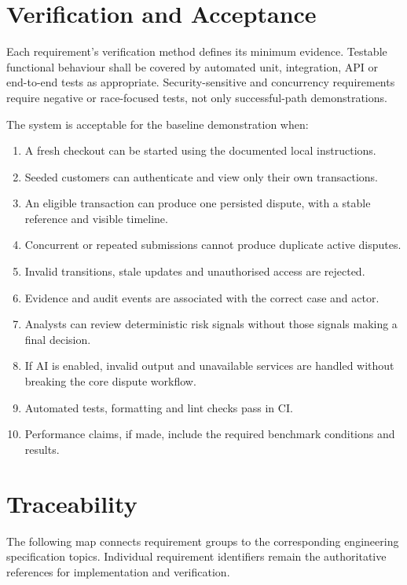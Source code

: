 \documentclass[11pt,a4paper]{article}
\begin{document}
\section{Verification and Acceptance}

Each requirement's verification method defines its minimum evidence.
Testable functional behaviour shall be covered by automated unit,
integration, API or end-to-end tests as appropriate. Security-sensitive
and concurrency requirements require negative or race-focused tests,
not only successful-path demonstrations.

The system is acceptable for the baseline demonstration when:

\begin{enumerate}
    \item A fresh checkout can be started using the documented local
    instructions.
    \item Seeded customers can authenticate and view only their own
    transactions.
    \item An eligible transaction can produce one persisted dispute,
    with a stable reference and visible timeline.
    \item Concurrent or repeated submissions cannot produce duplicate
    active disputes.
    \item Invalid transitions, stale updates and unauthorised access
    are rejected.
    \item Evidence and audit events are associated with the correct
    case and actor.
    \item Analysts can review deterministic risk signals without those
    signals making a final decision.
    \item If AI is enabled, invalid output and unavailable services are
    handled without breaking the core dispute workflow.
    \item Automated tests, formatting and lint checks pass in CI.
    \item Performance claims, if made, include the required benchmark
    conditions and results.
\end{enumerate}

\section{Traceability}

The following map connects requirement groups to the corresponding
engineering specification topics. Individual requirement identifiers
remain the authoritative references for implementation and verification.
\end{document}
